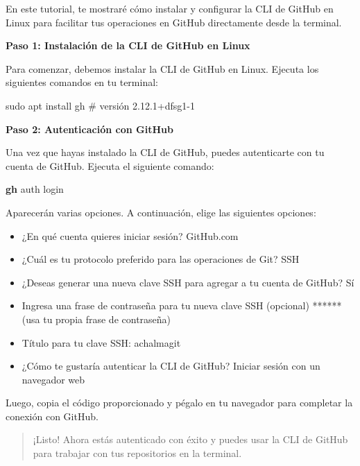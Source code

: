 \documentclass[
  a4paper,
]{article}
\newenvironment{Shaded}{}{}
\newcommand{\CommentTok}[1]{\textcolor[rgb]{0.42,0.45,0.49}{#1}}
\newcommand{\ExtensionTok}[1]{\textcolor[rgb]{0.84,0.23,0.29}{\textbf{#1}}}
\newcommand{\FunctionTok}[1]{\textcolor[rgb]{0.44,0.26,0.76}{#1}}
\newcommand{\NormalTok}[1]{\textcolor[rgb]{0.14,0.16,0.18}{#1}}
\providecommand{\tightlist}{%
  \setlength{\itemsep}{0pt}\setlength{\parskip}{0pt}}\usepackage{longtable,booktabs,array}
\begin{document}
En este tutorial, te mostraré cómo instalar y configurar la CLI de
GitHub en Linux para facilitar tus operaciones en GitHub directamente
desde la terminal.

\textbf{Paso 1: Instalación de la CLI de GitHub en Linux}

Para comenzar, debemos instalar la CLI de GitHub en Linux. Ejecuta los
siguientes comandos en tu terminal:

\begin{Shaded}
\begin{Highlighting}[]
\FunctionTok{sudo}\NormalTok{ apt install gh }\CommentTok{\# versión 2.12.1+dfsg1{-}1}
\end{Highlighting}
\end{Shaded}

\textbf{Paso 2: Autenticación con GitHub}

Una vez que hayas instalado la CLI de GitHub, puedes autenticarte con tu
cuenta de GitHub. Ejecuta el siguiente comando:

\begin{Shaded}
\begin{Highlighting}[]
\ExtensionTok{gh}\NormalTok{ auth login}
\end{Highlighting}
\end{Shaded}

Aparecerán varias opciones. A continuación, elige las siguientes
opciones:

\begin{itemize}
\tightlist
\item
  ¿En qué cuenta quieres iniciar sesión? GitHub.com
\item
  ¿Cuál es tu protocolo preferido para las operaciones de Git? SSH
\item
  ¿Deseas generar una nueva clave SSH para agregar a tu cuenta de
  GitHub? Sí
\item
  Ingresa una frase de contraseña para tu nueva clave SSH (opcional)
  ****** (usa tu propia frase de contraseña)
\item
  Título para tu clave SSH: achalmagit
\item
  ¿Cómo te gustaría autenticar la CLI de GitHub? Iniciar sesión con un
  navegador web
\end{itemize}

Luego, copia el código proporcionado y pégalo en tu navegador para
completar la conexión con GitHub.

\begin{quote}
¡Listo! Ahora estás autenticado con éxito y puedes usar la CLI de GitHub
para trabajar con tus repositorios en la terminal.
\end{quote}
\end{document}
